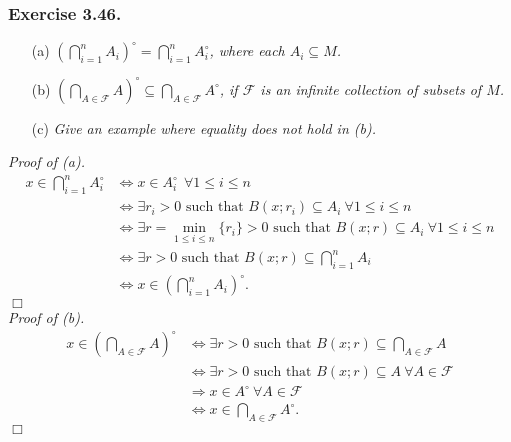 \documentclass{article}
\begin{document}



\subsubsection*{Exercise 3.46.}
\begin{enumerate}
\item[(a)]
\emph{$\left( \bigcap_{i=1}^{n} A_i \right)^{\circ} = \bigcap_{i=1}^{n} A_i^{\circ}$,
where each $A_i \subseteq M$. }
\item[(b)]
\emph{$\left( \bigcap_{A \in \mathscr{F}} A \right)^{\circ}
\subseteq \bigcap_{A \in \mathscr{F}} A^{\circ}$,
if $\mathscr{F}$ is an infinite collection of subsets of $M$. }
\item[(c)]
\emph{Give an example where equality does not hold in (b). } \\
\end{enumerate}

\emph{Proof of (a).}
\begin{align*}
x \in \bigcap_{i=1}^{n} A_i^{\circ}
&\Longleftrightarrow
x \in A_i^{\circ} \: \: \forall 1 \leq i \leq n \\
&\Longleftrightarrow
\exists r_i > 0 \text{ such that } B(x;r_i) \subseteq A_i \: \forall 1 \leq i \leq n \\
&\Longleftrightarrow
\exists r = \min_{1 \leq i \leq n}\{r_i\} > 0 \text{ such that }
  B(x;r) \subseteq A_i \: \forall 1 \leq i \leq n \\
&\Longleftrightarrow
\exists r > 0 \text{ such that }
  B(x;r) \subseteq \bigcap_{i=1}^{n} A_i \\
&\Longleftrightarrow
x \in \left( \bigcap_{i=1}^{n} A_i \right)^{\circ}.
\end{align*}
$\Box$ \\

\emph{Proof of (b).}
\begin{align*}
x \in \left( \bigcap_{A \in \mathscr{F}} A \right)^{\circ}
&\Longleftrightarrow
\exists r > 0 \text{ such that }
  B(x;r) \subseteq \bigcap_{A \in \mathscr{F}} A \\
&\Longleftrightarrow
\exists r > 0 \text{ such that } B(x;r) \subseteq A \: \forall A \in \mathscr{F} \\
&\Longrightarrow
x \in A^{\circ} \: \forall A \in \mathscr{F} \\
&\Longleftrightarrow
x \in \bigcap_{A \in \mathscr{F}} A^{\circ}.
\end{align*}
$\Box$ \\
\end{document}
